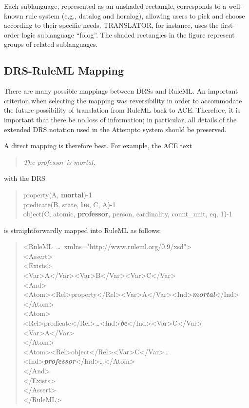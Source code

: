 \documentclass[12pt]{article}
\begin{document}
Each sublanguage, represented as an unshaded rectangle, corresponds to a well-known rule system (e.g., datalog and hornlog), allowing users to pick and choose according to their specific needs. TRANSLATOR, for instance, uses the first-order logic sublanguage ``folog''. The shaded rectangles in the figure represent groups of related sublanguages.

\subsection{DRS-RuleML Mapping}

There are many possible mappings between DRSs and RuleML. An important criterion when selecting the mapping was reversibility in order to accommodate the future possibility of translation from RuleML back to ACE. Therefore, it is important that there be no loss of information; in particular, all details of the extended DRS notation used in the Attempto system should be preserved.

A direct mapping is therefore best. For example, the ACE text
\begin{quote}
\textit{The professor is mortal.}
\end{quote}
with the DRS
\begin{quote}
{
 property(A, \textbf{mortal})-1\\
 predicate(B, state, \textbf{be}, C, A)-1\\
 object(C, atomic, \textbf{professor}, person, cardinality, count\_unit, eq, 1)-1
}
\end{quote}
is straightforwardly mapped into RuleML as follows:

\newcommand{\dave}[1]
{\rmfamily\normalsize\emph{\textbf{#1}}\ttfamily\small}

\begin{quote}
\small
\ttfamily
\setlength{\parindent}{0.1in}
<RuleML~\ldots~xmlns="http://www.ruleml.org/0.9/xsd">\\
\indent <Assert>\\
\indent \indent <Exists>\\
\indent \indent \indent <Var>A</Var><Var>B</Var><Var>C</Var>\\
\indent \indent \indent <And>\\
\indent \indent \indent \indent <Atom><Rel>property</Rel><Var>A</Var><Ind>\dave{mortal}</Ind></Atom>\\
\indent \indent \indent \indent <Atom>\\
\indent \indent \indent \indent \indent <Rel>predicate</Rel>\ldots <Ind>\dave{be}</Ind><Var>C</Var><Var>A</Var>\\
\indent \indent \indent \indent </Atom>\\
\indent \indent \indent \indent 
<Atom><Rel>object</Rel><Var>C</Var>\ldots<Ind>\dave{professor}</Ind>\ldots</Atom>\\
\indent \indent \indent </And>\\
\indent \indent </Exists>\\
\indent </Assert>\\
</RuleML>
\setlength{\parindent}{0.0in}
\normalfont
\end{quote}
\end{document}
